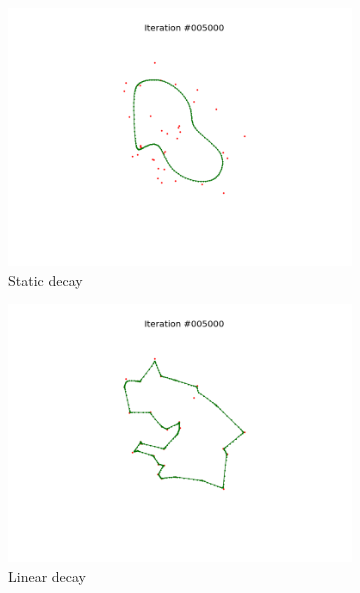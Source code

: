 \documentclass[11pt]{article}
\begin{document}
\begin{figure}
\centering
\begin{subfigure}{.33\textwidth}
  \centering
  \includegraphics[trim={6cm 2cm 6cm 2cm}, clip=true,
  width=\linewidth]{d_s.png}
  \caption{Static decay}
\end{subfigure}%
\begin{subfigure}{.33\textwidth}
  \centering
  \includegraphics[trim={6cm 2cm 6cm 2cm}, clip=true,width=\linewidth]{d_l.png}
  \caption{Linear decay}
\end{subfigure}
\begin{subfigure}{.33\textwidth}
  \centering

\end{subfigure}
\end{figure}
\end{document}
